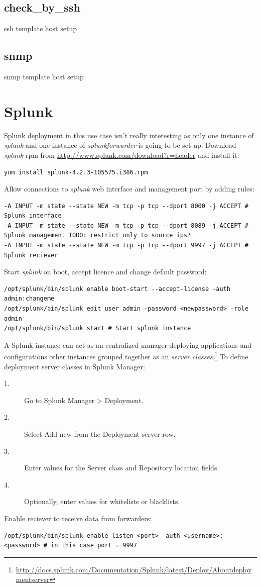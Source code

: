 \documentclass[10pt,a4paper,final]{report}
\begin{document}
\section{check\_by\_ssh}
ssh template  host setup
\section{snmp}
snmp template  host setup

\chapter{Splunk}
Splunk deployment in this use case isn't really interesting as only one instance of \emph{splunk} and one instance of \emph{splunkforwarder} is going to be set up.
Download \emph{splunk} rpm from \url{http://www.splunk.com/download?r=header} and install it:
\begin{lstlisting}
yum install splunk-4.2.3-105575.i386.rpm
\end{lstlisting}
Allow connections to \emph{splunk} web interface and management port by adding rules:
\begin{lstlisting}
-A INPUT -m state --state NEW -m tcp -p tcp --dport 8000 -j ACCEPT # Splunk interface
-A INPUT -m state --state NEW -m tcp -p tcp --dport 8089 -j ACCEPT # Splunk management TODO: restrict only to source ips?
-A INPUT -m state --state NEW -m tcp -p tcp --dport 9997 -j ACCEPT # Splunk reciever
\end{lstlisting}
Start \emph{splunk} on boot, accept licence and change default password:
\begin{lstlisting}
/opt/splunk/bin/splunk enable boot-start --accept-license -auth admin:changeme
/opt/splunk/bin/splunk edit user admin -password <newpassword> -role admin
/opt/splunk/bin/splunk start # Start splunk instance
\end{lstlisting}
A Splunk instance can act as an centralized manager deploying applications and configurations other instances grouped together as an \emph{server classes}.\footnote{\url{http://docs.splunk.com/Documentation/Splunk/latest/Deploy/Aboutdeploymentserver}} To define deployment server classes in Splunk Manager:
\begin{description}
\item[1.] Go to Splunk Manager > Deployment.
\item[2.] Select Add new from the Deployment server row.
\item[3.] Enter values for the Server class and Repository location fields.
\item[4.] Optionally, enter values for whitelists or blacklists. 
\end{description}
Enable reciever to receive data from forwarders:
\begin{lstlisting}
/opt/splunk/bin/splunk enable listen <port> -auth <username>:<password> # in this case port = 9997
\end{lstlisting}
\end{document}
